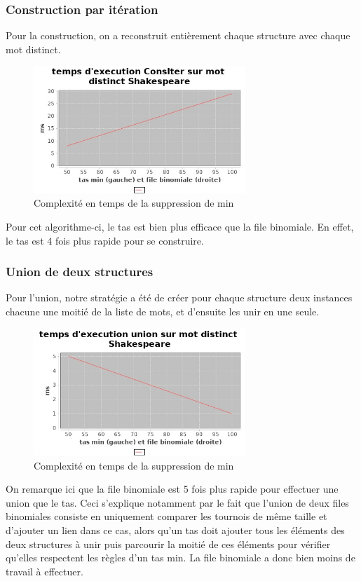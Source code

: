 \documentclass{article}
\begin{document}
\subsubsection{Construction par itération}

Pour la construction, on a reconstruit entièrement chaque structure avec chaque mot distinct.

\begin{figure}[h!]
\centering
\includegraphics[width=8cm]{consiter_SP_tas_array.jpg}
\caption{Complexité en temps de la suppression de min}
\label{fig:fbtascons}
\end{figure}

Pour cet algorithme-ci, le tas est bien plus efficace que la file binomiale. En effet, le tas est 4 fois plus rapide pour se construire. %

\subsubsection{Union de deux structures}

Pour l’union, notre stratégie a été de créer pour chaque structure deux instances chacune une moitié de la liste de mots, et d’ensuite les unir en une seule. 
\begin{figure}[h!]
\centering
\includegraphics[width=8cm]{union_SP_tas_array.jpg}
\caption{Complexité en temps de la suppression de min}
\label{fig:fbtascons}
\end{figure}

On remarque ici que la file binomiale est 5 fois plus rapide pour effectuer une union que le tas. Ceci s’explique notamment par le fait que l’union de deux files binomiales consiste en uniquement comparer les tournois de même taille et d’ajouter un lien dans ce cas, alors qu’un tas doit ajouter tous les éléments des deux structures à unir puis parcourir la moitié de ces éléments pour vérifier qu’elles respectent les règles d’un tas min. La file binomiale a donc bien moins de travail à effectuer.
\end{document}
